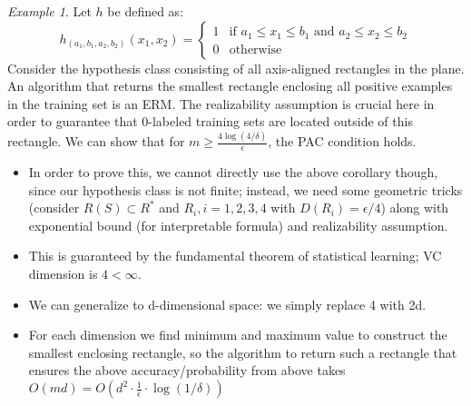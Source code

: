 \documentclass{article}
\theoremstyle{remark}
\newtheorem{example}{Example}
\begin{document}
\begin{example}
    Let \( h \) be defined as:
    \[
    h_{(a_1, b_1, a_2, b_2)}(x_1, x_2) = 
    \begin{cases} 
    1 & \text{if } a_1 \leq x_1 \leq b_1 \text{ and } a_2 \leq x_2 \leq b_2 \\
    0 & \text{otherwise}
    \end{cases}
    \]
    Consider the hypothesis class consisting of all axis-aligned rectangles in the plane.
    An algorithm that returns the smallest rectangle enclosing all positive examples in the training set is an ERM. 
    The realizability assumption is crucial here in order to guarantee that 0-labeled training sets are located outside of this rectangle. We can show that for $m\geq \frac{4\log(4/\delta)}\epsilon$, the PAC condition holds. 
    \begin{itemize}
    \item In order to prove this, we cannot directly use the above corollary though, since our hypothesis class is not finite;
        instead, we need some geometric tricks (consider $R(S)\subset R^*$ and $R_i, i=1,2,3,4$ with $D(R_i)=\epsilon/4$) along with exponential bound (for interpretable formula) and realizability assumption.
    \item This is guaranteed by the fundamental theorem of statistical learning; VC dimension is $4<\infty$.
    \item We can generalize to d-dimensional space: we simply replace 4 with 2d.
    \item For each dimension we find minimum and maximum value to construct the smallest enclosing rectangle, so the algorithm to return such a rectangle that ensures the above accuracy/probability from above takes $O(md)=O(d^2\cdot\frac 1\epsilon\cdot \log(1/\delta))$
    \end{itemize}
    
\end{example}
\end{document}
